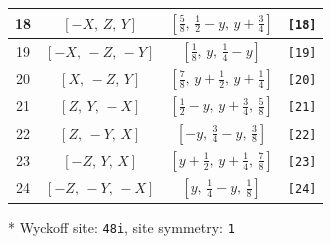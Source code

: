\documentclass[fleqn,8pt]{jsarticle}
\begin{document}
\begin{longtable}{cccc}
18 & $\left[ - X,\, Z,\, Y \right]$ & $\left[ \frac{5}{8},\, \frac{1}{2} - y,\, y + \frac{3}{4} \right]$ & {\tt [18]} \\ \hline
19 & $\left[ - X,\, - Z,\, - Y \right]$ & $\left[ \frac{1}{8},\, y,\, \frac{1}{4} - y \right]$ & {\tt [19]} \\ \hline
20 & $\left[ X,\, - Z,\, Y \right]$ & $\left[ \frac{7}{8},\, y + \frac{1}{2},\, y + \frac{1}{4} \right]$ & {\tt [20]} \\ \hline
21 & $\left[ Z,\, Y,\, - X \right]$ & $\left[ \frac{1}{2} - y,\, y + \frac{3}{4},\, \frac{5}{8} \right]$ & {\tt [21]} \\ \hline
22 & $\left[ Z,\, - Y,\, X \right]$ & $\left[ - y,\, \frac{3}{4} - y,\, \frac{3}{8} \right]$ & {\tt [22]} \\ \hline
23 & $\left[ - Z,\, Y,\, X \right]$ & $\left[ y + \frac{1}{2},\, y + \frac{1}{4},\, \frac{7}{8} \right]$ & {\tt [23]} \\ \hline
24 & $\left[ - Z,\, - Y,\, - X \right]$ & $\left[ y,\, \frac{1}{4} - y,\, \frac{1}{8} \right]$ & {\tt [24]} \\
\end{longtable}
* Wyckoff site: {\tt 48i}, site symmetry: {\tt 1}
\renewcommand{\arraystretch}{1.2}
\end{document}
